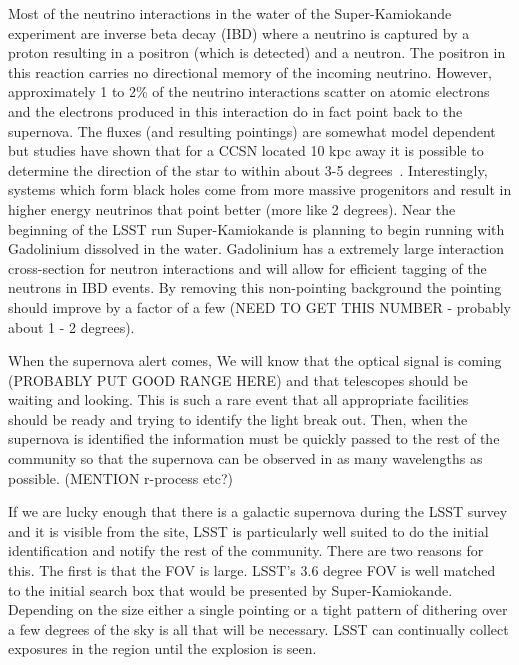 \documentclass[11pt]{article}
\begin{document}
Most of the neutrino interactions in the water of the Super-Kamiokande
experiment are inverse beta decay (IBD) where a neutrino is captured
by a proton resulting in a positron (which is detected) and a neutron.
The positron in this reaction carries no directional memory of the
incoming neutrino.  However, approximately 1 to 2\% of the neutrino
interactions scatter on atomic electrons and the electrons produced in
this interaction do in fact point back to the supernova.  The fluxes
(and resulting pointings) are somewhat model dependent but studies
have shown that for a CCSN located 10 kpc away it is possible to
determine the direction of the star to within about 3-5
degrees~\cite{2016APh....81...39A}.  Interestingly, systems which form black
holes come from more massive progenitors and result in higher energy
neutrinos that point better (more like 2 degrees).  Near the beginning
of the LSST run Super-Kamiokande is planning to begin running with
Gadolinium dissolved in the water.  Gadolinium has a extremely large
interaction cross-section for neutron interactions and will allow for
efficient tagging of the neutrons in IBD events.  By removing this
non-pointing background the pointing should improve by a factor of a
few (NEED TO GET THIS NUMBER - probably about 1 - 2 degrees).

When the supernova alert comes,  We will know that the optical signal
is coming (PROBABLY PUT GOOD RANGE HERE) and that telescopes should be
waiting and looking.  This is such a rare event that all appropriate
facilities should be ready and trying to identify the light break
out.  Then, when the supernova is identified the information must be
quickly passed to the rest of the community so that the supernova can
be observed in as many wavelengths as possible. (MENTION r-process etc?)

If we are lucky enough that there is a galactic supernova during the
LSST survey and it is visible from the site, LSST is particularly well
suited to do the initial identification and notify the rest of the
community.  There are two reasons for this.  The first is that the FOV
is large. LSST's 3.6 degree FOV is well matched to the initial search
box that would be presented by Super-Kamiokande.  Depending on the
size either a single pointing or a tight pattern of dithering over a
few degrees of the sky is all that will be necessary.  LSST can
continually collect exposures in the region until the explosion is
seen.
\end{document}
